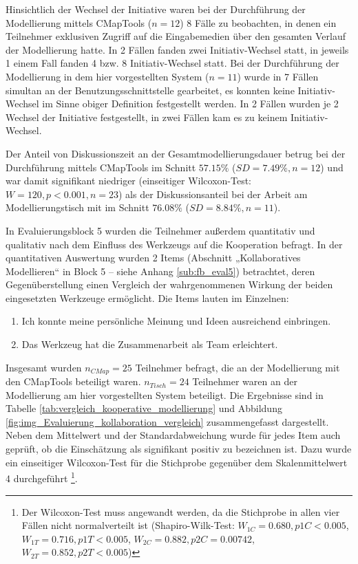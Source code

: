 Hinsichtlich der Wechsel der Initiative waren bei der Durchführung der Modellierung mittels CMapTools ($n=12$) 8 Fälle zu beobachten, in denen ein Teilnehmer exklusiven Zugriff auf die Eingabemedien über den gesamten Verlauf der Modellierung hatte. In 2 Fällen fanden zwei Initiativ-Wechsel statt, in jeweils 1 einem Fall fanden 4 bzw. 8 Initiativ-Wechsel statt. Bei der Durchführung der Modellierung in dem hier vorgestellten System ($n=11$) wurde in 7 Fällen simultan an der Benutzungsschnittstelle gearbeitet, es konnten keine Initiativ-Wechsel im Sinne obiger Definition festgestellt werden. In 2 Fällen wurden je 2 Wechsel der Initiative festgestellt, in zwei Fällen kam es zu keinem Initiativ-Wechsel.

Der Anteil von Diskussionszeit an der Gesamtmodellierungsdauer betrug bei der Durchführung mittels CMapTools im Schnitt $57.15\%$ ($SD=7.49\%, n=12$) und war damit signifikant niedriger (einseitiger Wilcoxon-Test: $W=120, p<0.001, n=23$) als der Diskussionsanteil bei der Arbeit am Modellierungstisch mit im Schnitt $76.08\%$ ($SD=8.84\%, n=11$).

In Evaluierungsblock 5 wurden die Teilnehmer außerdem quantitativ und qualitativ nach dem Einfluss des Werkzeugs auf die Kooperation befragt. In der quantitativen Auswertung wurden 2 Items (Abschnitt „Kollaboratives Modellieren“ in Block 5 -- siehe Anhang \ref{sub:fb_eval5}) betrachtet, deren Gegenüberstellung einen Vergleich der wahrgenommenen Wirkung der beiden eingesetzten Werkzeuge ermöglicht. Die Items lauten im Einzelnen:

\begin{enumerate}
	\item Ich konnte meine persönliche Meinung und Ideen ausreichend einbringen.
	\item Das Werkzeug hat die Zusammenarbeit als Team erleichtert.
\end{enumerate}

Insgesamt wurden $n_{CMap}=25$ Teilnehmer befragt, die an der Modellierung mit den CMapTools beteiligt waren. $n_{Tisch}=24$ Teilnehmer waren an der Modellierung am hier vorgestellten System beteiligt. Die Ergebnisse sind in Tabelle \ref{tab:vergleich_kooperative_modellierung} und Abbildung \ref{fig:img_Evaluierung_kollaboration_vergleich} zusammengefasst dargestellt. Neben dem Mittelwert und der Standardabweichung wurde für jedes Item auch geprüft, ob die Einschätzung als signifikant positiv zu bezeichnen ist. Dazu wurde ein einseitiger Wilcoxon-Test für die Stichprobe gegenüber dem Skalenmittelwert 4 durchgeführt \footnote{Der Wilcoxon-Test muss angewandt werden, da die Stichprobe in allen vier Fällen nicht normalverteilt ist (Shapiro-Wilk-Test: $W_{1C}=0.680, p{1C}<0.005$, $W_{1T}=0.716, p{1T}<0.005$, $W_{2C}=0.882, p{2C}=0.00742$, $W_{2T}=0.852, p{2T}<0.005$)}.


